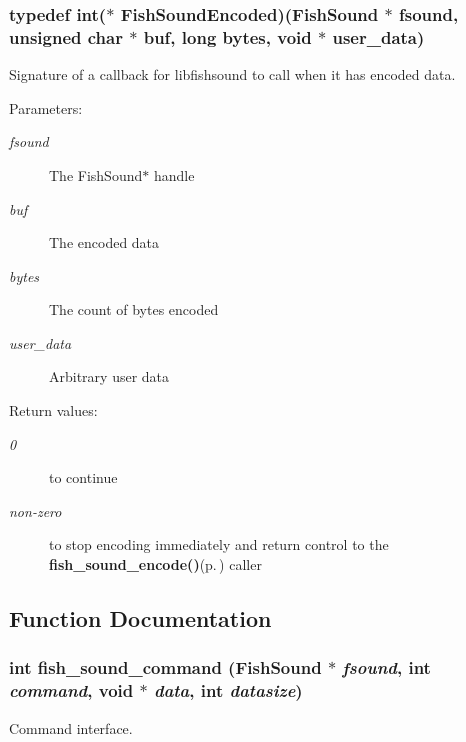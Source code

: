 \subsubsection{\setlength{\rightskip}{0pt plus 5cm}typedef int($\ast$ {\bf Fish\-Sound\-Encoded})({\bf Fish\-Sound} $\ast$ fsound, unsigned char $\ast$ buf, long bytes, void $\ast$ user\_\-data)}\label{fishsound_8h_a2}


Signature of a callback for libfishsound to call when it has encoded data. 

\begin{Desc}
\item[Parameters:]
\begin{description}
\item[{\em fsound}]The Fish\-Sound$\ast$ handle \item[{\em buf}]The encoded data \item[{\em bytes}]The count of bytes encoded \item[{\em user\_\-data}]Arbitrary user data \end{description}
\end{Desc}
\begin{Desc}
\item[Return values:]
\begin{description}
\item[{\em 0}]to continue \item[{\em non-zero}]to stop encoding immediately and return control to the {\bf fish\_\-sound\_\-encode()}{\rm (p.\,\pageref{fishsound_8h_a8})} caller \end{description}
\end{Desc}


\subsection{Function Documentation}
\subsubsection{\setlength{\rightskip}{0pt plus 5cm}int fish\_\-sound\_\-command ({\bf Fish\-Sound} $\ast$ {\em fsound}, int {\em command}, void $\ast$ {\em data}, int {\em datasize})}\label{fishsound_8h_a12}


Command interface. 

